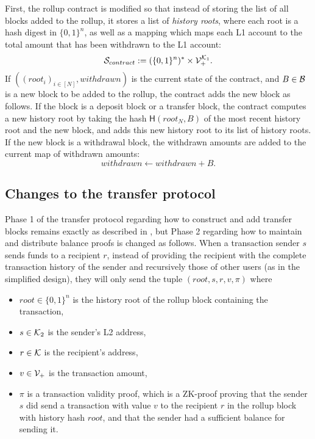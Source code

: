 First, the rollup contract is modified so that instead of storing the
list of all blocks added to the rollup, it stores a list of
\emph{history roots}, where each root is a hash digest in
\(\{0,1\}^n\), as well as a mapping which maps each L1 account to the
total amount that has been withdrawn to the L1 account:
\[\mathcal{S}_{contract} := (\{0,1\}^n)^* \times \mathcal{V}_+^{\mathcal{K}_1}.\] If
\(((root_i)_{i \in [N]}, withdrawn)\) is the current state of the
contract, and \(B \in \mathcal{B}\) is a new block to be added to the rollup,
the contract adds the new block as follows. If the block is a deposit
block or a transfer block, the contract computes a new history root
by taking the hash \(\mathsf{H}(root_N,B)\) of the most recent
history root and the new block, and adds this new history root to its
list of history roots. If the new block is a withdrawal block, the
withdrawn amounts are added to the current map of withdrawn amounts:
\[withdrawn \leftarrow withdrawn + B.\]

\subsection{Changes to the transfer protocol}

Phase 1 of the transfer protocol regarding how to construct and add
transfer blocks remains exactly as described in
, but Phase 2 regarding how to
maintain and distribute balance proofs is changed as follows. When a
transaction sender \(s\) sends funds to a recipient \(r\), instead of
providing the recipient with the complete transaction history of the
sender and recursively those of other users (as in the simplified
design), they will only send the tuple \((root, s, r, v, \pi)\) where

\begin{itemize}
\item \(root \in \{0,1\}^n\) is the history root of the rollup block
containing the transaction,
\item \(s \in \mathcal{K}_2\) is the sender's L2 address,
\item \(r \in \mathcal{K}\) is the recipient's address,
\item \(v \in \mathcal{V}_+\) is the transaction amount,
\item \(\pi\) is a transaction validity proof, which is a ZK-proof
proving that the sender \(s\) did send a transaction with value \(v\)
to the recipient \(r\) in the rollup block with history hash
\(root\), and that the sender had a sufficient balance for sending it.
\end{itemize}

